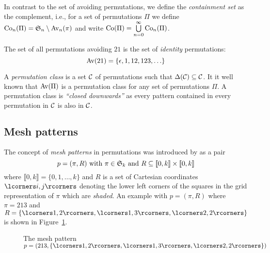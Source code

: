 In contrast to the set of avoiding permutations, we define the 
\emph{containment set} as the complement, i.e., for a set of permutations 
$\Pi$ we define $\Con{\Pi} = \S_n \setminus \Avn{\pi}$ and write $\Co{\Pi} = 
\bigcup\limits_{n=0}^{\infty}\Con{\Pi}$.

\begin{example}
  The set of all permutations avoiding $21$ is the set of \emph{identity} 
  permutations: \[ \Av{21} = \left\{ \epsilon, 1, 12, 123, \ldots \right\} \]
\end{example}

A \emph{permutation class} is a set $\mc{C}$ of permutations such that 
$\Delta(\mc{C}) \subseteq \mc{C}$. It it well known that $\Av{\Pi}$ is a 
permutation class for any set of permutations $\Pi$. A permutation class is 
\emph{``closed downwards''} as every pattern contained in every permutation in 
$\mc{C}$ is also in $\mc{C}$.


\subsection{Mesh patterns\label{mesh patterns background}}

The concept of \emph{mesh patterns} in permutations was introduced by 
\textcite{branden_mesh_2011} as a pair
\[p = (\pi, R) \text{ with } \pi \in \S_k \text{ and } R \subseteq \llbracket 
0, k \rrbracket \times \llbracket 0, k \rrbracket \] where $\llbracket 0, k 
\rrbracket = \{0, 1, \ldots, k\}$ and $R$ is a set of Cartesian coordinates 
$\boks{i, j}$ denoting the lower left corners of the squares in the grid 
representation of $\pi$ which are \emph{shaded}. An example with $p = (\pi, R)$ 
where $\pi = 213$ and $R = \left\{ \boks{1,2}, \boks{1,3}, \boks{2,2} \right\}$ 
is shown in Figure~\ref{figure: Gr(213, shading)}.

\begin{figure}[htbp]
  \center
  \caption{The mesh pattern $p = \left(213, \left\{ \boks{1,2}, \boks{1,3}, \boks{2,2} \right\} \right)$}
  \label{figure: Gr(213, shading)}
\end{figure}

